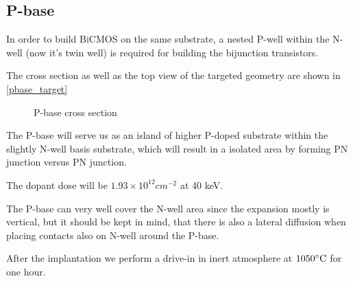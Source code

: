 \subsection{P-base}\label{pbase_chapter}

In order to build BiCMOS on the same substrate, a nested P-well within the N-well (now it's twin well) is required for building the bijunction transistors.

The cross section as well as the top view of the targeted geometry are shown in \autoref{pbase_target}

\begin{figure}[H]
	\centering
	\begin{tikzpicture}[node distance = 3cm, auto, thick,scale=\CrossAndTopSectionBig, every node/.style={transform shape}]
		
	\end{tikzpicture}
	\caption{P-base cross section}
	\label{pbase_target}
\end{figure}

The P-base will serve us as an island of higher P-doped substrate within the slightly N-well basis substrate, which will result in a isolated area by forming PN junction versus PN junction.

The dopant dose will be $1.93\times10^{12}cm^{-2}$ at 40 keV.

The P-base can very well cover the N-well area since the expansion mostly is vertical, but it should be kept in mind, that there is also a lateral diffusion when placing contacts also on N-well around the P-base.

After the implantation we perform a drive-in in inert atmosphere at $1050\degreesC$ for one hour.
